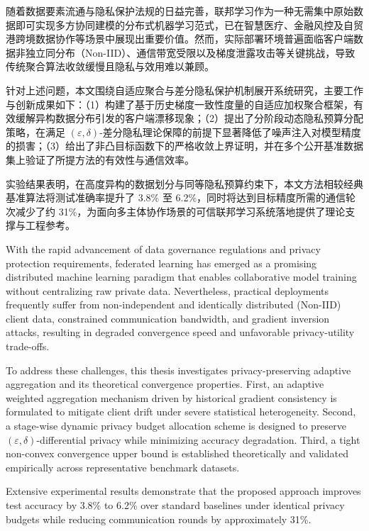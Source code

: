 
\begin{cnabstract}
随着数据要素流通与隐私保护法规的日益完善，联邦学习作为一种无需集中原始数据即可实现多方协同建模的分布式机器学习范式，已在智慧医疗、金融风控及自贸港跨境数据协作等场景中展现出重要价值。然而，实际部署环境普遍面临客户端数据非独立同分布（Non-IID）、通信带宽受限以及梯度泄露攻击等关键挑战，导致传统聚合算法收敛缓慢且隐私与效用难以兼顾。

针对上述问题，本文围绕自适应聚合与差分隐私保护机制展开系统研究，主要工作与创新成果如下：（1）构建了基于历史梯度一致性度量的自适应加权聚合框架，有效缓解异构数据分布引发的客户端漂移现象；（2）提出了分阶段动态隐私预算分配策略，在满足 $(\varepsilon, \delta)$-差分隐私理论保障的前提下显著降低了噪声注入对模型精度的损害；（3）给出了非凸目标函数下的严格收敛上界证明，并在多个公开基准数据集上验证了所提方法的有效性与通信效率。

实验结果表明，在高度异构的数据划分与同等隐私预算约束下，本文方法相较经典基准算法将测试准确率提升了 3.8\% 至 6.2\%，同时将达到目标精度所需的通信轮次减少了约 31\%，为面向多主体协作场景的可信联邦学习系统落地提供了理论支撑与工程参考。
\end{cnabstract}

\begin{enabstract}
With the rapid advancement of data governance regulations and privacy protection requirements, federated learning has emerged as a promising distributed machine learning paradigm that enables collaborative model training without centralizing raw private data. Nevertheless, practical deployments frequently suffer from non-independent and identically distributed (Non-IID) client data, constrained communication bandwidth, and gradient inversion attacks, resulting in degraded convergence speed and unfavorable privacy-utility trade-offs.

To address these challenges, this thesis investigates privacy-preserving adaptive aggregation and its theoretical convergence properties. First, an adaptive weighted aggregation mechanism driven by historical gradient consistency is formulated to mitigate client drift under severe statistical heterogeneity. Second, a stage-wise dynamic privacy budget allocation scheme is designed to preserve $(\varepsilon, \delta)$-differential privacy while minimizing accuracy degradation. Third, a tight non-convex convergence upper bound is established theoretically and validated empirically across representative benchmark datasets.

Extensive experimental results demonstrate that the proposed approach improves test accuracy by 3.8\% to 6.2\% over standard baselines under identical privacy budgets while reducing communication rounds by approximately 31\%.
\end{enabstract}
